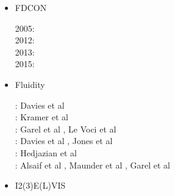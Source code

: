\begin{itemize}
\item FDCON 

\begin{scriptsize}
2005: \cite{enbs05}\\
2012: \cite{crsg12}\\
2013: \cite{fusc13}\\
2015: \cite{fuks15}
\end{scriptsize}

\item Fluidity 

\begin{scriptsize}
\noindent
\twothousandeleven: Davies et al \cite{dawk11}\\
\twothousandtwelve: Kramer et al \cite{krwd12}\\
\twothousandfourteen: Garel et al \cite{gagd14}, Le Voci et al \cite{ledg14}\\
\twothousandsixteen: Davies et al \cite{dalg16}, Jones et al \cite{jodc16} \\
\twothousandseventeen: Hedjazian et al \cite{hegd17}\\
\twothousandtwenty: Alsaif et al \cite{algg20}, Maunder et al \cite{mapg20}, Garel et al \cite{gatt20}
\end{scriptsize}

\item {\codefont I2(3)E(L)VIS}  


\end{itemize}
